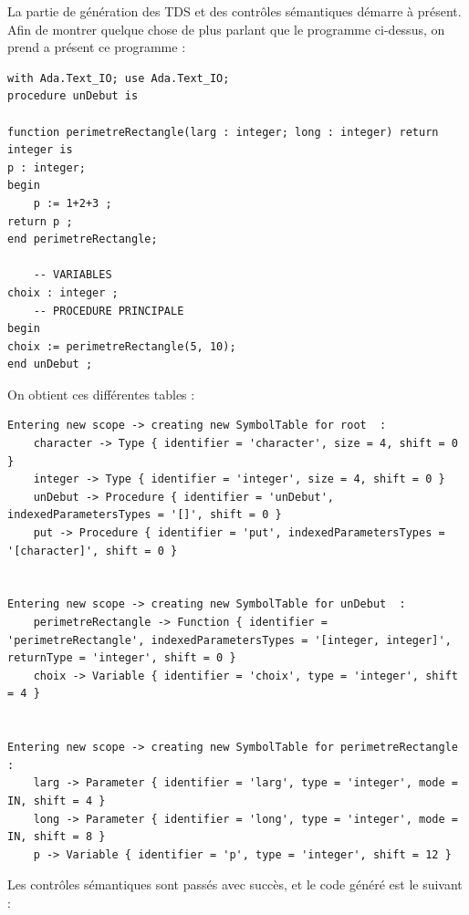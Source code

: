 \documentclass[french,a4paper]{article}
\begin{document}
    La partie de génération des TDS et des contrôles sémantiques démarre à présent. Afin de montrer quelque chose de plus parlant que le programme ci-dessus, on prend a présent ce programme :

    \begin{lstlisting}[label={lst:lstlisting16}]
with Ada.Text_IO; use Ada.Text_IO;
procedure unDebut is

function perimetreRectangle(larg : integer; long : integer) return integer is
p : integer;
begin
    p := 1+2+3 ;
return p ;
end perimetreRectangle;

    -- VARIABLES
choix : integer ;
    -- PROCEDURE PRINCIPALE
begin
choix := perimetreRectangle(5, 10);
end unDebut ;
    \end{lstlisting}

    On obtient ces différentes tables :

    \begin{lstlisting}
Entering new scope -> creating new SymbolTable for root  :
    character -> Type { identifier = 'character', size = 4, shift = 0 }
    integer -> Type { identifier = 'integer', size = 4, shift = 0 }
    unDebut -> Procedure { identifier = 'unDebut', indexedParametersTypes = '[]', shift = 0 }
    put -> Procedure { identifier = 'put', indexedParametersTypes = '[character]', shift = 0 }


Entering new scope -> creating new SymbolTable for unDebut  :
    perimetreRectangle -> Function { identifier = 'perimetreRectangle', indexedParametersTypes = '[integer, integer]', returnType = 'integer', shift = 0 }
    choix -> Variable { identifier = 'choix', type = 'integer', shift = 4 }


Entering new scope -> creating new SymbolTable for perimetreRectangle  :
    larg -> Parameter { identifier = 'larg', type = 'integer', mode = IN, shift = 4 }
    long -> Parameter { identifier = 'long', type = 'integer', mode = IN, shift = 8 }
    p -> Variable { identifier = 'p', type = 'integer', shift = 12 }
    \end{lstlisting}

    Les contrôles sémantiques sont passés avec succès, et le code généré est le suivant :
\end{document}
